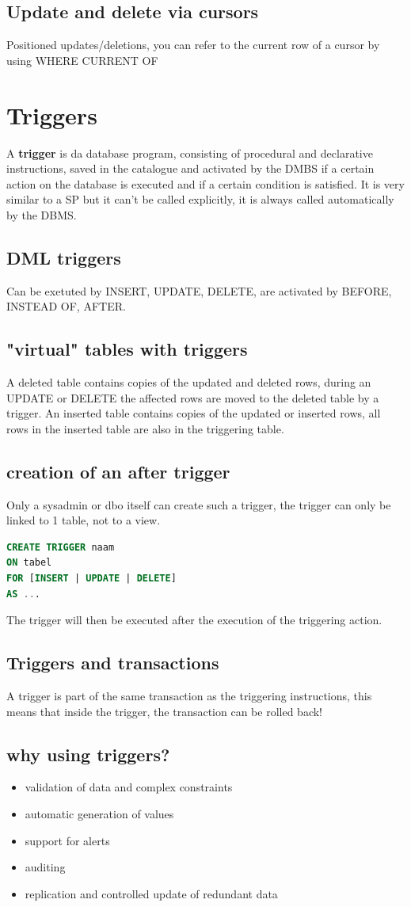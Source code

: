\documentclass{report}
\begin{document}
			\subsection{Update and delete via cursors}
				Positioned updates/deletions, you can refer to the current row of a cursor by using WHERE CURRENT OF
		\section{Triggers}
			A \textbf{trigger} is da database program, consisting of procedural and declarative instructions, saved in the catalogue and activated by the DMBS if a certain action on the database is executed and if a certain condition is satisfied. It is very similar to a SP but it can't be called explicitly, it is always called automatically by the DBMS.
			\subsection{DML triggers}
				Can be exetuted by INSERT, UPDATE, DELETE, are activated by BEFORE, INSTEAD OF, AFTER.
			\subsection{"virtual" tables with triggers}
				A deleted table contains copies of the updated and deleted rows, during an UPDATE or DELETE the affected rows are moved to the deleted table by a trigger. An inserted table contains copies of the updated or inserted rows, all rows in the inserted table are also in the triggering table. 
			\subsection{creation of an after trigger}
				Only a sysadmin or dbo itself can create such a trigger, the trigger can only be linked to 1 table, not to a view. 
				\begin{lstlisting}[language=sql]
CREATE TRIGGER naam
ON tabel
FOR [INSERT | UPDATE | DELETE]
AS ... \end{lstlisting}
				The trigger will then be executed after the execution of the triggering action.
			\subsection{Triggers and transactions}
				A trigger is part of the same transaction as the triggering instructions, this means that inside the trigger, the transaction can be rolled back!
			\subsection{why using triggers?}
				\begin{itemize}
					\item validation of data and complex constraints 
					\item automatic generation of values
					\item support for alerts
					\item auditing
					\item replication and controlled update of redundant data
				\end{itemize}
\end{document}
